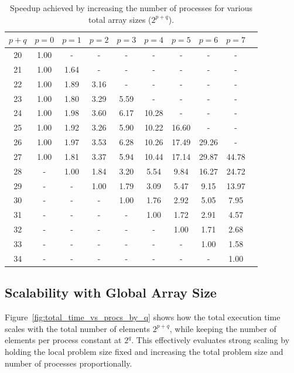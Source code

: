 \documentclass{article}
\begin{document}
\begin{table}[h]
\centering
\begin{tabular}{|c|c|c|c|c|c|c|c|c|c|}
\hline
\textbf{$p + q$} & \textbf{$p=0$} & \textbf{$p=1$} & \textbf{$p=2$} & \textbf{$p=3$} & 
\textbf{$p=4$} & \textbf{$p=5$} & \textbf{$p=6$} & \textbf{$p=7$} \\
\hline
20 & 1.00 & -    & -    & -    & -    & -    & -    & -    \\
21 & 1.00 & 1.64 & -    & -    & -    & -    & -    & -    \\
22 & 1.00 & 1.89 & 3.16 & -    & -    & -    & -    & -    \\
23 & 1.00 & 1.80 & 3.29 & 5.59 & -    & -    & -    & -    \\
24 & 1.00 & 1.98 & 3.60 & 6.17 & 10.28 & -   & -    & -    \\
25 & 1.00 & 1.92 & 3.26 & 5.90 & 10.22 & 16.60 & - & -    \\
26 & 1.00 & 1.97 & 3.53 & 6.28 & 10.26 & 17.49 & 29.26 & - \\
27 & 1.00 & 1.81 & 3.37 & 5.94 & 10.44 & 17.14 & 29.87 & 44.78 \\
28 & -    & 1.00 & 1.84 & 3.20 & 5.54  & 9.84  & 16.27 & 24.72 \\
29 & -    & -    & 1.00 & 1.79 & 3.09  & 5.47  & 9.15  & 13.97 \\
30 & -    & -    & -    & 1.00 & 1.76  & 2.92  & 5.05  & 7.95  \\
31 & -    & -    & -    & -    & 1.00  & 1.72  & 2.91  & 4.57  \\
32 & -    & -    & -    & -    & -     & 1.00  & 1.71  & 2.68  \\
33 & -    & -    & -    & -    & -     & -     & 1.00  & 1.58  \\
34 & -    & -    & -    & -    & -     & -     & -     & 1.00  \\
\hline
\end{tabular}
\caption{Speedup achieved by increasing the number of processes for various total array sizes ($2^{p+q}$).}
\label{tab:speedup_by_procs}
\end{table}

\subsection{Scalability with Global Array Size}

Figure~\ref{fig:total_time_vs_procs_by_q} shows how the total execution time scales with the total number of 
elements $2^{p+q}$, while keeping the number of elements per process constant at $2^q$. This effectively 
evaluates strong scaling by holding the local problem size fixed and increasing the total problem size and 
number of processes proportionally.
\end{document}
